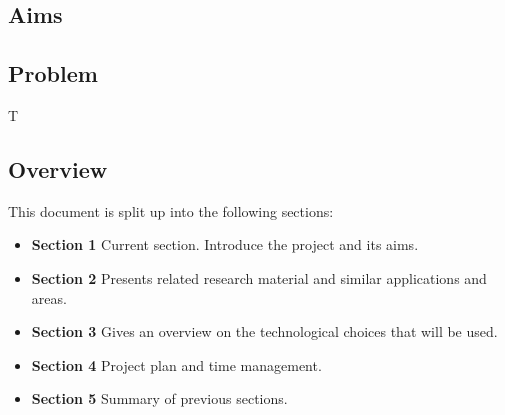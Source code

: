 \subsection{Aims}
\lipsum[3]





\subsection{Problem}
T\lipsum[4]

\subsection{Overview}
This document is split up into the following sections:
\begin{itemize}
 \item \textbf{Section 1} Current section. Introduce the project and its aims.
 \item \textbf{Section 2} Presents related research material and similar applications and areas.
 \item \textbf{Section 3} Gives an overview on the technological choices that will be used.
 \item \textbf{Section 4} Project plan and time management.
 \item \textbf{Section 5} Summary of previous sections.
\end{itemize}

